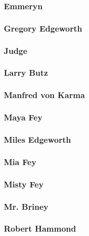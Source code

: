 \subsubsection{Emmeryn}
\label{people:emmeryn}


\subsubsection{Gregory Edgeworth}
\label{people:gregory}

\subsubsection{Judge}
\label{people:judge}

\subsubsection{Larry Butz}
\label{people:larry}

\subsubsection{Manfred von Karma}
\label{people:mvonkarma}

\subsubsection{Maya Fey}
\label{people:mayafey}

\subsubsection{Miles Edgeworth}
\label{people:miles}

\subsubsection{Mia Fey}
\label{people:miafey}

\subsubsection{Misty Fey}
\label{people:mistyfey}

\subsubsection{Mr. Briney}
\label{people:briney}

\subsubsection{Robert Hammond}
\label{people:hammond}

